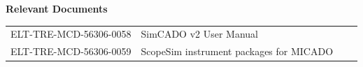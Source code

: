 \documentclass[a4paper,twoside,11pt]{article}
\begin{document}


\setcounter{tocdepth}{3}
\tableofcontents
\clearpage


\begin{center}
  \textbf{Relevant Documents}

  \tabletail{\hline}

  \begin{supertabular}{|l|l|l|l|}
   ELT-TRE-MCD-56306-0058 & SimCADO v2 User Manual \\
   ELT-TRE-MCD-56306-0059 & ScopeSim instrument packages for MICADO \\
   \hline
  \end{supertabular}

\end{center}








\end{document}
